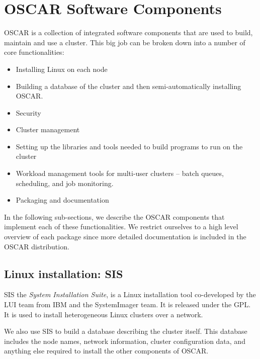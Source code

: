 \documentclass[letterpaper,11pt]{article}
\begin{document}
\section{OSCAR Software Components}
OSCAR is a collection of integrated software components that are used
to build, maintain and use a cluster.  This big job can be broken down
into a number of core functionalities:

\begin{itemize}
        \item Installing Linux on each node

        \item Building a database of the cluster and then
        semi-automatically installing OSCAR.

        \item Security

        \item Cluster management

        \item Setting up the libraries and tools needed to build programs
        to run on the cluster

        \item Workload management tools for multi-user clusters -- batch
        queues, scheduling, and job monitoring.

        \item Packaging and documentation
\end{itemize}

In the following sub-sections, we describe the OSCAR components that
implement each of these functionalities.  We restrict ourselves to a
high level overview of each package since more detailed documentation
is included in the OSCAR distribution.


\subsection{Linux installation: SIS}
SIS \cite{SIS} the \emph{System Installation Suite}, is a
Linux installation tool co-developed by the LUI team from IBM and 
the SystemImager\cite{SI}  team. It is released under the GPL.
It is used to install heterogeneous Linux clusters over a network.

We also use SIS to build a database describing the cluster itself.
This database includes the node names, network information, cluster
configuration data, and anything else required to install the other
components of OSCAR.
\end{document}
